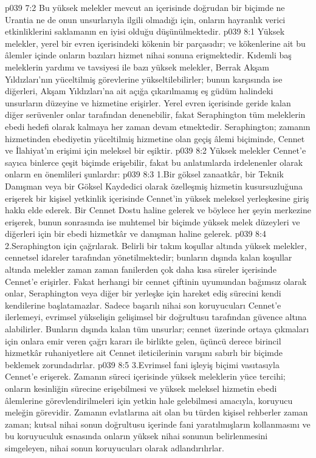 \vs p039 7:2 Bu yüksek melekler mevcut an içerisinde doğrudan bir biçimde ne Urantia ne de onun unsurlarıyla ilgili olmadığı için, onların hayranlık verici etkinliklerini saklamanın en iyisi olduğu düşünülmektedir.
\vs p039 8:1 Yüksek melekler, yerel bir evren içerisindeki kökenin bir parçasıdır; ve kökenlerine ait bu âlemler içinde onların bazıları hizmet nihai sonuna erişmektedir. Kıdemli baş meleklerin yardımı ve tavsiyesi ile bazı yüksek melekler, Berrak Akşam Yıldızları’nın yüceltilmiş görevlerine yükseltilebilirler; bunun karşısında ise diğerleri, Akşam Yıldızları’na ait açığa çıkarılmamış eş güdüm halindeki unsurların düzeyine ve hizmetine erişirler. Yerel evren içerisinde geride kalan diğer serüvenler onlar tarafından denenebilir, fakat Seraphington tüm meleklerin ebedi hedefi olarak kalmaya her zaman devam etmektedir. Seraphington; zamanın hizmetinden ebediyetin yüceltilmiş hizmetine olan geçiş âlemi biçiminde, Cennet ve İlahiyat’ın erişimi için meleksel bir eşiktir.
\vs p039 8:2 Yüksek melekler Cennet’e sayıca binlerce çeşit biçimde erişebilir, fakat bu anlatımlarda irdelenenler olarak onların en önemlileri şunlardır:
\vs p039 8:3 1.\bibnobreakspace Bir göksel zanaatkâr, bir Teknik Danışman veya bir Göksel Kaydedici olarak özelleşmiş hizmetin kusursuzluğuna erişerek bir kişisel yetkinlik içerisinde Cennet’in yüksek meleksel yerleşkesine giriş hakkı elde ederek. Bir Cennet Dostu haline gelerek ve böylece her şeyin merkezine erişerek, bunun sonrasında ise muhtemel bir biçimde yüksek melek düzeyleri ve diğerleri için bir ebedi hizmetkâr ve danışman haline gelerek.
\vs p039 8:4 2.\bibnobreakspace Seraphington için çağrılarak. Belirli bir takım koşullar altında yüksek melekler, cennetsel idareler tarafından yönetilmektedir; bunların dışında kalan koşullar altında melekler zaman zaman fanilerden çok daha kısa süreler içerisinde Cennet’e erişirler. Fakat herhangi bir cennet çiftinin uyumundan bağımsız olarak onlar, Seraphington veya diğer bir yerleşke için hareket ediş sürecini kendi kendilerine başlatamazlar. Sadece başarılı nihai son koruyucuları Cennet’e ilerlemeyi, evrimsel yükselişin gelişimsel bir doğrultusu tarafından güvence altına alabilirler. Bunların dışında kalan tüm unsurlar; cennet üzerinde ortaya çıkmaları için onlara emir veren çağrı kararı ile birlikte gelen, üçüncü derece birincil hizmetkâr ruhaniyetlere ait Cennet ileticilerinin varışını sabırlı bir biçimde beklemek zorundadırlar.
\vs p039 8:5 3.\bibnobreakspace Evrimsel fani işleyiş biçimi vasıtasıyla Cennet’e erişerek. Zamanın süreci içerisinde yüksek meleklerin yüce tercihi; onların kesinliğin sürecine erişebilmesi ve yüksek meleksel hizmetin ebedi âlemlerine görevlendirilmeleri için yetkin hale gelebilmesi amacıyla, koruyucu meleğin görevidir. Zamanın evlatlarına ait olan bu türden kişisel rehberler zaman zaman; kutsal nihai sonun doğrultusu içerinde fani yaratılmışların kollanmasını ve bu koruyuculuk esnasında onların yüksek nihai sonunun belirlenmesini simgeleyen, nihai sonun koruyucuları olarak adlandırılırlar.

